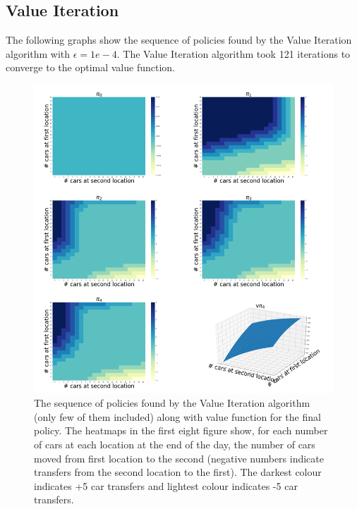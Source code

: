 \documentclass{article}
\begin{document}
\subsection{Value Iteration}
The following graphs show the sequence of policies found by the Value Iteration algorithm with $\epsilon=1e-4$. The Value Iteration
algorithm took 121 iterations to converge to the optimal value function.
\begin{figure}[H]
    \graphicspath{ {../Experiments/JackRentalProblem/ValueIteration/} }
    \begin{center}
    \includegraphics[width=15cm]{Compact.png}
    \end{center}
    \caption{The sequence of policies found by the Value Iteration algorithm (only few of them included) along with value function
    for the final policy. The heatmaps in the first eight figure show, for each number of cars at each location at the end of the
    day, the number of cars moved from first location to the second (negative numbers indicate transfers from the second location 
    to the first). The darkest colour indicates +5 car transfers and lightest colour indicates -5 car transfers.}
\end{figure}
\end{document}
